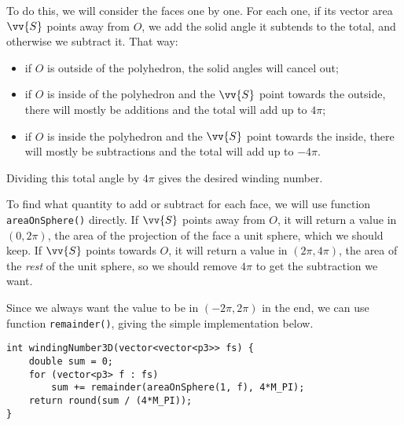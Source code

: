To do this, we will consider the faces one by one.
For each one, if its vector area $\vv{S}$ points away from $O$, we add the solid angle it subtends to the total, and otherwise we subtract it.
That way:
\begin{itemize}
\item if $O$ is outside of the polyhedron, the solid angles will cancel out;
\item if $O$ is inside of the polyhedron and the $\vv{S}$ point towards the outside, there will mostly be additions and the total will add up to $4\pi$;
\item if $O$ is inside the polyhedron and the $\vv{S}$ point towards the inside, there will mostly be subtractions and the total will add up to $-4\pi$.
\end{itemize}
Dividing this total angle by $4\pi$ gives the desired winding number.


To find what quantity to add or subtract for each face, we will use function \lstinline|areaOnSphere()| directly. If $\vv{S}$ points away from $O$, it will return a value in $(0,2\pi)$, the area of the projection of the face a unit sphere, which we should keep. If $\vv{S}$ points towards $O$, it will return a value in $(2\pi,4\pi)$, the area of the \emph{rest} of the unit sphere, so we should remove $4\pi$ to get the subtraction we want.

Since we always want the value to be in $(-2\pi,2\pi)$ in the end, we can use function \lstinline|remainder()|, giving the simple implementation below.
\begin{lstlisting}
int windingNumber3D(vector<vector<p3>> fs) {
    double sum = 0;
    for (vector<p3> f : fs)
        sum += remainder(areaOnSphere(1, f), 4*M_PI);
    return round(sum / (4*M_PI));
}
\end{lstlisting}
